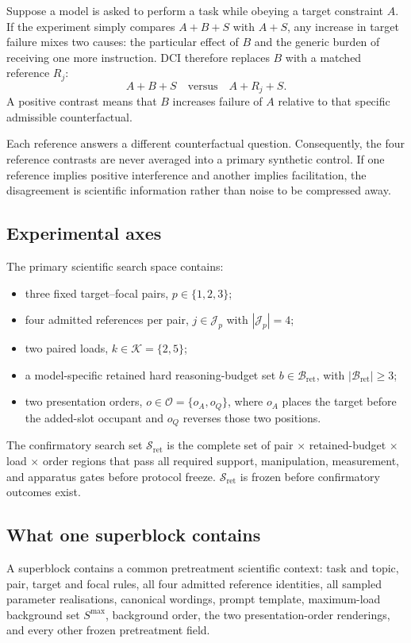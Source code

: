 \documentclass[11pt,a4paper]{article}
\newcommand{\Bret}{\mathcal B_{\mathrm{ret}}}
\newcommand{\Sc}{\mathcal S_{\mathrm{ret}}}
\newcommand{\Oset}{\mathcal O}
\begin{document}
Suppose a model is asked to perform a task while obeying a target constraint $A$. If the experiment simply compares $A+B+S$ with $A+S$, any increase in target failure mixes two causes: the particular effect of $B$ and the generic burden of receiving one more instruction. DCI therefore replaces $B$ with a matched reference $R_j$:
\[
A+B+S
\quad\text{versus}\quad
A+R_j+S.
\]
A positive contrast means that $B$ increases failure of $A$ relative to that specific admissible counterfactual.

Each reference answers a different counterfactual question. Consequently, the four reference contrasts are never averaged into a primary synthetic control. If one reference implies positive interference and another implies facilitation, the disagreement is scientific information rather than noise to be compressed away.

\subsection{Experimental axes}

The primary scientific search space contains:
\begin{itemize}
\item three fixed target--focal pairs, $p\in\{1,2,3\}$;
\item four admitted references per pair, $j\in\mathcal J_p$ with $|\mathcal J_p|=4$;
\item two paired loads, $k\in\mathcal K=\{2,5\}$;
\item a model-specific retained hard reasoning-budget set $b\in\Bret$, with $|\Bret|\ge 3$;
\item two presentation orders, $o\in\Oset=\{o_A,o_Q\}$, where $o_A$ places the target before the added-slot occupant and $o_Q$ reverses those two positions.
\end{itemize}

The confirmatory search set $\Sc$ is the complete set of pair $\times$ retained-budget $\times$ load $\times$ order regions that pass all required support, manipulation, measurement, and apparatus gates before protocol freeze. $\Sc$ is frozen before confirmatory outcomes exist.

\subsection{What one superblock contains}

A superblock contains a common pretreatment scientific context: task and topic, pair, target and focal rules, all four admitted reference identities, all sampled parameter realisations, canonical wordings, prompt template, maximum-load background set $S^{\max}$, background order, the two presentation-order renderings, and every other frozen pretreatment field.
\end{document}
